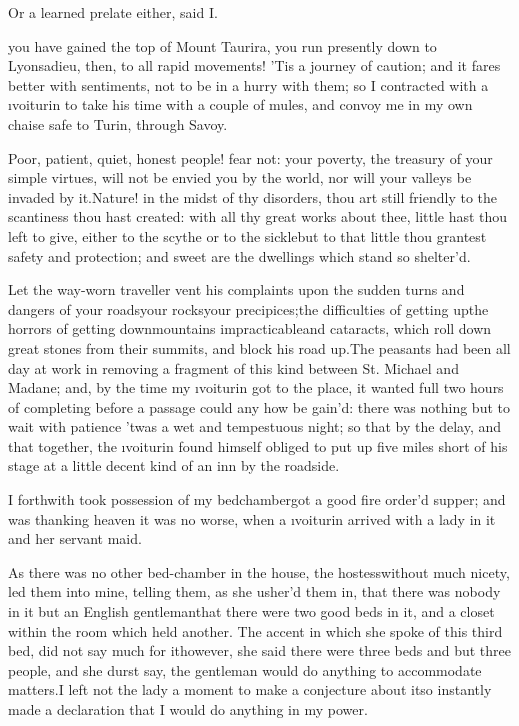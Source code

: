 \documentclass[twoside]{article}
\begin{document}
Or a learned prelate either, said I.





\vskip 6pt


 you have gained the top
of Mount Taurira, you run presently down
to Lyons\tskk adieu, then, to all rapid
movements!  ’Tis a journey of caution; and
it fares better with sentiments, not to be
in a hurry with them; so I contracted with
a \i{voiturin} to take his time with a
couple of mules, and convoy me in my own
chaise safe to Turin, through Savoy.

Poor, patient, quiet, honest people! fear
not: your poverty, the treasury of your
simple virtues, will not be envied you by
the world, nor will your valleys be
invaded by it.\tskk Nature! in the midst
of thy disorders, thou art still friendly
to the scantiness thou hast created: with
all thy great works about thee, little
hast thou left to give, either to the
scythe or to the sickle\tskk but to that
little thou grantest safety and
protection; and sweet are the dwellings
which stand so shelter’d.

Let the way-worn traveller vent his
complaints upon the sudden turns and
dangers of your roads\tskk your
rocks\tskk your precipices;\tskk the
difficulties of getting up\tskk the
horrors of getting down\tskk mountains
impracticable\tskk and cataracts, which
roll down great stones from their summits,
and block his road up.\tskk The peasants
had been all day at work in removing a
fragment of this kind between St. Michael
and Madane; and, by the time my
\i{voiturin} got to the place, it wanted
full two hours of completing before a
passage could any how be gain’d: there was
nothing but to wait with patience\tskk
’twas a wet and tempestuous night; so that
by the delay, and that together, the
\i{voiturin} found himself obliged to put
up five miles short of his stage at a
little decent kind of an inn by the
roadside.

I forthwith took possession of my
bedchamber\tskk got a good fire\tskk
order’d supper; and was thanking heaven it
was no worse, when a \i{voiturin} arrived
with a lady in it and her servant maid.

As there was no other bed-chamber in the
house, the hostess\tskk without much
nicety, led them into mine, telling them,
as she usher’d them in, that there was
nobody in it but an English
gentleman\tskk that there were two good
beds in it, and a closet within the room
which held another.  The accent in which
she spoke of this third bed, did not say
much for it\tskk however, she said there
were three beds and but three people, and
she durst say, the gentleman would do
anything to accommodate matters.\tskk I
left not the lady a moment to make a
conjecture about it\tskk so instantly made
a declaration that I would do anything in
my power.
\end{document}
